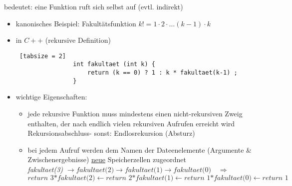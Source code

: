 \documentclass{article}
\begin{document}
	 	bedeutet: eine Funktion ruft sich selbst auf (evtl. indirekt)
	 	\begin{itemize}
	 		\item kanonisches Beispiel: Fakultätsfunktion $k! = 1 \cdot 2 \cdot \dots (k-1) \cdot k$
	 		\item in $C++$ (rekursive Definition)
	 		\begin{lstlisting} [tabsize = 2]
	 			int fakultaet (int k) {
		 			return (k == 0) ? 1 : k * fakultaet(k-1) ;
	 			}
	 		\end{lstlisting}
	 		\item wichtige Eigenschaften:
	 		\begin{itemize}
	 			\item jede rekursive Funktion muss mindestens einen nicht-rekursiven Zweig enthalten, der nach endlich vielen rekursiven Aufrufen erreicht wird \grqq Rekursionsabschluss\grqq - sonst: Endlosrekursion (Absturz)
				\item bei jedem Aufruf werden dem Namen der Dateenelemente (Argumente \& Zwischenergebnisse) \underline{neue} Speicherzellen zugeordnet \\
				\textit{fakultaet(3)} $\rightarrow \textit{fakultaet(2)} \rightarrow \textit{fakultaet(1)} \rightarrow \textit{fakultaet(0)} \quad \Rightarrow $ \\
				$\textit{return 3*fakultaet(2)} \leftarrow \textit{return 2*fakultaet(1)} \leftarrow \textit{return 1*fakultaet(0)} \leftarrow \textit{return 1}$
				
	 		\end{itemize}
	 	\end{itemize}
	 	
\end{document}
